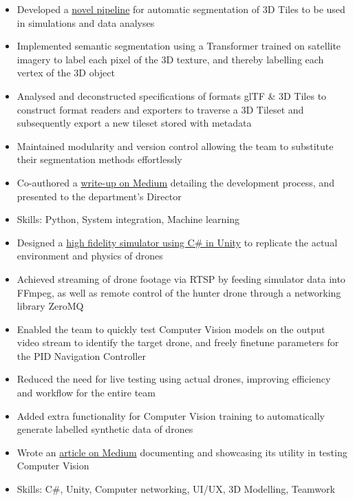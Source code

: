 \documentclass{cv}
\begin{document}
\begin{subsections}
    \subtitle{Simulation \& Training Systems Hub, Defence Science and Technology Agency \hfill Singapore}
    \begin{itemize}
        \item Developed a \href{https://github.com/thedylone/tile-segmentation-pipeline}{novel pipeline} for automatic segmentation of 3D Tiles to be used in simulations and data analyses
        \item Implemented semantic segmentation using a Transformer trained on satellite imagery to label each pixel of the 3D texture, and thereby labelling each vertex of the 3D object
        \item Analysed and deconstructed specifications of formats glTF \& 3D Tiles to construct format readers and exporters to traverse a 3D Tileset and subsequently export a new tileset stored with metadata
        \item Maintained modularity and version control allowing the team to substitute their segmentation methods effortlessly
        \item Co-authored a \href{https://medium.com/d-classified/segmentation-pipeline-for-3d-tiles-1303fcb5e6be}{write-up on Medium} detailing the development process, and presented to the department's Director
        \item Skills: Python, System integration, Machine learning
    \end{itemize}

    \subtitle{Command, Control and Communications Development, Defence Science and Technology Agency \hfill Singapore}
    \begin{itemize}
        \item Designed a \href{https://github.com/thedylone/unity-drone-simulator}{high fidelity simulator using C\# in Unity} to replicate the actual environment and physics of drones
        \item Achieved streaming of drone footage via RTSP by feeding simulator data into FFmpeg, as well as remote control of the hunter drone through a networking library ZeroMQ
        \item Enabled the team to quickly test Computer Vision models on the output video stream to identify the target drone, and freely finetune parameters for the PID Navigation Controller
        \item Reduced the need for live testing using actual drones, improving efficiency and workflow for the entire team
        \item Added extra functionality for Computer Vision training to automatically generate labelled synthetic data of drones
        \item Wrote an \href{https://medium.com/d-classified/unity-as-a-testbed-for-autonomy-development-1e326323c68d}{article on Medium} documenting and showcasing its utility in testing Computer Vision
        \item Skills: C\#, Unity, Computer networking, UI/UX, 3D Modelling, Teamwork
    \end{itemize}


\end{subsections}
\end{document}

